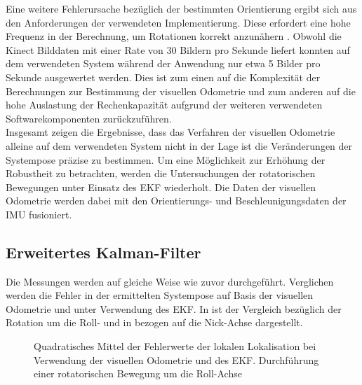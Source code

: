 Eine weitere Fehlerursache bezüglich der bestimmten Orientierung ergibt sich aus den Anforderungen der verwendeten Implementierung. Diese erfordert eine hohe Frequenz in der Berechnung, um Rotationen korrekt anzunähern \cite{Fovis}. Obwohl die Kinect Bilddaten mit einer Rate von \SI{30}{} Bildern pro Sekunde liefert konnten auf dem verwendeten System während der Anwendung nur etwa \SI{5}{} Bilder pro Sekunde ausgewertet werden. Dies ist zum einen auf die Komplexität der Berechnungen zur Bestimmung der visuellen Odometrie und zum anderen auf die hohe Auslastung der Rechenkapazität aufgrund der weiteren verwendeten Softwarekomponenten zurückzuführen.\\ 

Insgesamt zeigen die Ergebnisse, dass das Verfahren der visuellen Odometrie alleine auf dem verwendeten System nicht in der Lage ist die Veränderungen der Systempose präzise zu bestimmen. Um eine Möglichkeit zur Erhöhung der Robustheit zu betrachten, werden die Untersuchungen der rotatorischen Bewegungen unter Einsatz des EKF wiederholt. Die Daten der visuellen Odometrie werden dabei mit den Orientierungs- und Beschleunigungsdaten der IMU fusioniert.

\subsection{Erweitertes Kalman-Filter}
Die Messungen werden auf gleiche Weise wie zuvor durchgeführt. Verglichen werden die Fehler in der ermittelten Systempose auf Basis der visuellen Odometrie und unter Verwendung des EKF. In  ist der Vergleich bezüglich der Rotation um die Roll- und in  bezogen auf die Nick-Achse dargestellt.\\


\begin{figure}[!ht]

\caption{Quadratisches Mittel der Fehlerwerte der lokalen Lokalisation bei Verwendung der visuellen Odometrie und des EKF. Durchführung einer rotatorischen Bewegung um die Roll-Achse}
\label{fig.loc_loc_rot_ekf_roll}
\end{figure}%

